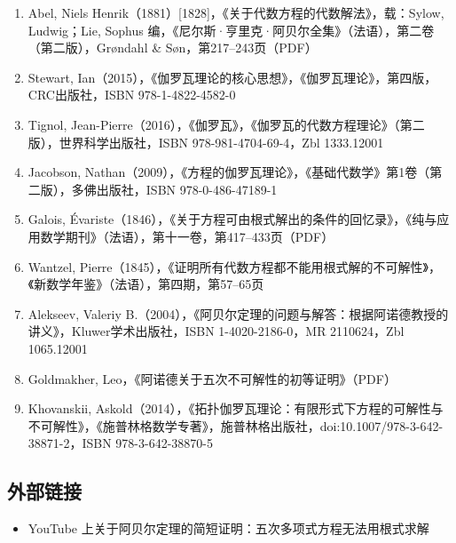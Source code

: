 \begin{enumerate}
\item Abel, Niels Henrik（1881）[1828]，《关于代数方程的代数解法》，载：Sylow, Ludwig；Lie, Sophus 编，《尼尔斯·亨里克·阿贝尔全集》（法语），第二卷（第二版），Grøndahl & Søn，第217–243页（PDF）
\item Stewart, Ian（2015），《伽罗瓦理论的核心思想》，《伽罗瓦理论》，第四版，CRC出版社，ISBN 978-1-4822-4582-0
\item Tignol, Jean-Pierre（2016），《伽罗瓦》，《伽罗瓦的代数方程理论》（第二版），世界科学出版社，ISBN 978-981-4704-69-4，Zbl 1333.12001
\item Jacobson, Nathan（2009），《方程的伽罗瓦理论》，《基础代数学》第1卷（第二版），多佛出版社，ISBN 978-0-486-47189-1
\item Galois, Évariste（1846），《关于方程可由根式解出的条件的回忆录》，《纯与应用数学期刊》（法语），第十一卷，第417–433页（PDF）
\item Wantzel, Pierre（1845），《证明所有代数方程都不能用根式解的不可解性》，《新数学年鉴》（法语），第四期，第57–65页
\item Alekseev, Valeriy B.（2004），《阿贝尔定理的问题与解答：根据阿诺德教授的讲义》，Kluwer学术出版社，ISBN 1-4020-2186-0，MR 2110624，Zbl 1065.12001
\item Goldmakher, Leo，《阿诺德关于五次不可解性的初等证明》（PDF）
\item Khovanskii, Askold（2014），《拓扑伽罗瓦理论：有限形式下方程的可解性与不可解性》，《施普林格数学专著》，施普林格出版社，doi:10.1007/978-3-642-38871-2，ISBN 978-3-642-38870-5
\end{enumerate}
\subsection{外部链接}
\begin{itemize}
\item YouTube 上关于阿贝尔定理的简短证明：五次多项式方程无法用根式求解
\end{itemize}
